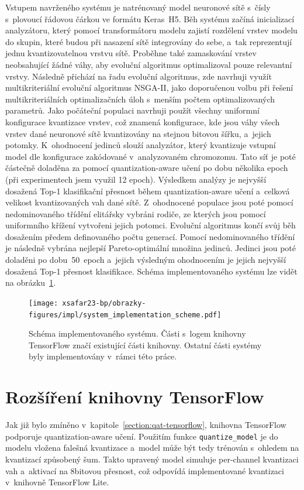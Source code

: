 Vstupem navrženého systému je natrénovaný model neuronové sítě s~čísly s~plovoucí řádovou čárkou ve formátu Keras~H5. Běh systému začíná inicializací analyzátoru, který pomocí transformátoru modelu zajistí rozdělení vrstev modelu do skupin, které budou při nasazení sítě integrovány do sebe, a~tak reprezentují jednu kvantizovatelnou vrstvu sítě. Proběhne také zamaskování vrstev neobsahující žádné váhy, aby evoluční algoritmus optimalizoval pouze relevantní vrstvy. Následně přichází na řadu evoluční algoritmus, zde navrhuji využít multikriteriální evoluční algoritmus NSGA-II, jako doporučenou volbu při řešení multikriteriálních optimalizačních úloh s~menším počtem optimalizovaných parametrů. Jako počáteční populaci navrhuji použít všechny uniformní konfigurace kvantizace vrstev, což znamená konfigurace, kde jsou váhy všech vrstev dané neuronové sítě kvantizovány na stejnou bitovou šířku, a~jejich potomky. K~ohodnocení jedinců slouží analyzátor, který kvantizuje vstupní model dle konfigurace zakódované v~analyzovaném chromozomu. Tato síť je poté částečně doladěna za pomocí quantization-aware učení po dobu několika epoch (při experimentech jsem využil 12 epoch). Výsledkem analýzy je nejvyšší dosažená Top-1 klasifikační přesnost během quantization-aware učení a~celková velikost kvantizovaných vah dané sítě. Z~ohodnocené populace jsou poté pomocí nedominovaného třídění elitářsky vybráni rodiče, ze kterých jsou pomocí uniformního křížení vytvořeni jejich potomci. Evoluční algoritmus končí svůj běh dosažením předem definovaného počtu generací. Pomocí nedominovaného třídění je následně vybrána nejlepší Pareto-optimální množina jedinců. Jedinci jsou poté doladěni po dobu~50~epoch a~jejich výsledným ohodnocením je jejich nejvyšší dosažená Top-1 přesnost klasifikace. Schéma implementovaného systému lze vidět na obrázku~\ref{fig:system-impl}.

\begin{figure}[h]
	\centering
	\texttt{[image: xsafar23-bp/obrazky-figures/impl/system\_implementation\_scheme.pdf]}
	\caption{Schéma implementovaného systému. Části s~logem knihovny TensorFlow značí existující části knihovny. Ostatní části systémy byly implementovány v~rámci této práce.}
	\label{fig:system-impl} 
\end{figure}

\section{Rozšíření knihovny TensorFlow}

Jak již bylo zmíněno v~kapitole~\ref{section:qat-tensorflow}, knihovna TensorFlow podporuje quantization-aware učení. Použitím funkce \verb|quantize_model| je do modelu vložena falešná kvantizace a~model může být tedy trénován s~ohledem na kvantizací způsobený šum. Takto upravený model simuluje per-channel kvantizaci vah a~aktivací na 8bitovou přesnost, což odpovídá implementované kvantizaci v~knihovně TensorFlow Lite.

